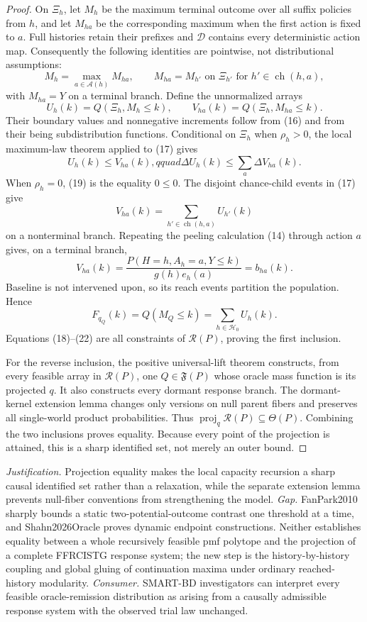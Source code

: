 \documentclass{article}
\begin{document}
\begin{proof}
On \(\Xi_h\), let \(M_h\) be the maximum terminal outcome over all suffix policies from \(h\), and let \(M_{ha}\) be the corresponding maximum when the first action is fixed to \(a\).  Full histories retain their prefixes and \(\mathcal D\) contains every deterministic action map.  Consequently the following identities are pointwise, not distributional assumptions:
\[
 M_h=\max_{a\in\mathcal A(h)}M_{ha},
 \qquad
 M_{ha}=M_{h'}\text{ on }\Xi_{h'}\text{ for }h'\in\operatorname{ch}(h,a),  \tag{17}
\]
with \(M_{ha}=Y\) on a terminal branch.  Define the unnormalized arrays
\[
 U_h(k)=Q(\Xi_h,M_h\leq k),
 \qquad
 V_{ha}(k)=Q(\Xi_h,M_{ha}\leq k).                         \tag{18}
\]
Their boundary values and nonnegative increments follow from (16) and from their being subdistribution functions.  Conditional on \(\Xi_h\) when \(\rho_h>0\), the local maximum-law theorem applied to (17) gives
\[
 U_h(k)\leq V_{ha}(k),qquad
 \Delta U_h(k)\leq\sum_a\Delta V_{ha}(k).                \tag{19}
\]
When \(\rho_h=0\), (19) is the equality \(0\leq0\).  The disjoint chance-child events in (17) give
\[
 V_{ha}(k)=\sum_{h'\in\operatorname{ch}(h,a)}U_{h'}(k)    \tag{20}
\]
on a nonterminal branch.  Repeating the peeling calculation (14) through action \(a\) gives, on a terminal branch,
\[
 V_{ha}(k)=\frac{P(H=h,A_h=a,Y\leq k)}{g(h)e_h(a)}=b_{ha}(k). \tag{21}
\]
Baseline is not intervened upon, so its reach events partition the population.  Hence
\[
 F_{q_Q}(k)=Q(M_Q\leq k)=\sum_{h\in\mathcal H_0}U_h(k).   \tag{22}
\]
Equations (18)--(22) are all constraints of \(\mathcal R(P)\), proving the first inclusion.

For the reverse inclusion, the positive universal-lift theorem constructs, from every feasible array in \(\mathcal R(P)\), one \(Q\in\mathfrak F(P)\) whose oracle mass function is its projected \(q\).  It also constructs every dormant response branch.  The dormant-kernel extension lemma changes only versions on null parent fibers and preserves all single-world product probabilities.  Thus \(\operatorname{proj}_q\mathcal R(P)\subseteq\Theta(P)\).  Combining the two inclusions proves equality.  Because every point of the projection is attained, this is a sharp identified set, not merely an outer bound.
\end{proof}
\par\smallskip\noindent \textit{Justification.} Projection equality makes the local capacity recursion a sharp causal identified set rather than a relaxation, while the separate extension lemma prevents null-fiber conventions from strengthening the model. \textit{Gap.} FanPark2010 sharply bounds a static two-potential-outcome contrast one threshold at a time, and Shahn2026Oracle proves dynamic endpoint constructions. Neither establishes equality between a whole recursively feasible pmf polytope and the projection of a complete FFRCISTG response system; the new step is the history-by-history coupling and global gluing of continuation maxima under ordinary reached-history modularity. \textit{Consumer.} SMART-BD investigators can interpret every feasible oracle-remission distribution as arising from a causally admissible response system with the observed trial law unchanged.
\end{document}
